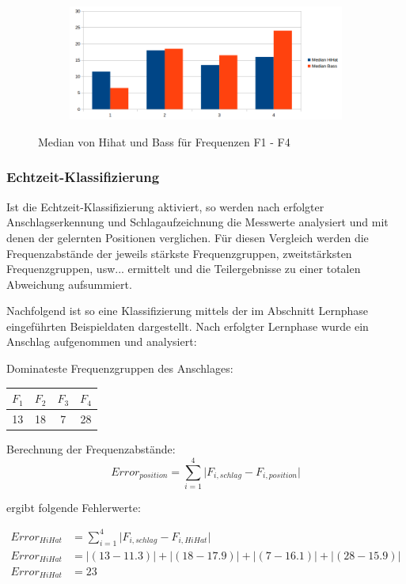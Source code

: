 \begin{figure}[H]
\centering
\begin{subfigure}{.5\textwidth}
		\includegraphics[scale=0.5]{figures/Median_2.png}
\end{subfigure}
\caption{Median von Hihat und Bass für Frequenzen F1 - F4}
\label{fig:FFT_Median}
\end{figure}


\subsubsection*{Echtzeit-Klassifizierung}
Ist die Echtzeit-Klassifizierung aktiviert, so werden nach erfolgter Anschlagserkennung und Schlagaufzeichnung die Messwerte analysiert und mit denen der gelernten Positionen verglichen. 
Für diesen Vergleich werden die Frequenzabstände der jeweils stärkste Frequenzgruppen, zweitstärksten Frequenzgruppen, usw... ermittelt und die Teilergebnisse zu einer totalen Abweichung aufsummiert.

Nachfolgend ist so eine Klassifizierung mittels der im Abschnitt Lernphase eingeführten Beispieldaten dargestellt. Nach erfolgter Lernphase wurde ein Anschlag aufgenommen und analysiert:

Dominateste Frequenzgruppen des Anschlages: 
\begin{tabular}{c c c c}
$F_1$ & $F_2$ & $F_3$ & $F_4$\\
\hline
 13  &	18 &	7 &	28\\
\end{tabular}

Berechnung der Frequenzabstände:
\begin{displaymath}
Error_{position} = \sum_{i=1}^{4} \lvert F_{i,schlag} - F_{i,position}\rvert
\end{displaymath}

ergibt folgende Fehlerwerte:


\begin{align*}
Error_{HiHat} &= \sum_{i=1}^{4}  \lvert F_{i,schlag} - F_{i,HiHat}\rvert \\
Error_{HiHat} &= \lvert(13-11.3)\rvert + \lvert(18-17.9)\rvert + \lvert(7-16.1)\rvert + \lvert(28-15.9)\rvert \\
Error_{HiHat} &= 23
\end{align*}


